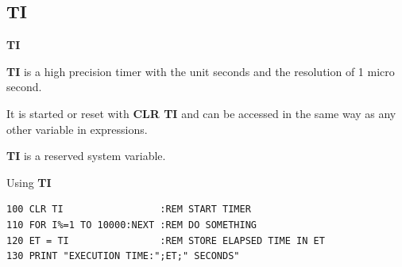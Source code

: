 \newpage
\subsection{TI}
\begin{description}[leftmargin=2cm,style=nextline]
\item [Format:] {\bf TI}
\item [Usage:]  {\bf TI} is a high precision timer with
                the unit seconds and the
                resolution of 1 micro second.

                It is started or reset with
                {\bf CLR TI} and can be accessed in the same way as any
                other variable in expressions.
\item [Remarks:] {\bf TI} is a reserved system variable.

\item [Example:] Using {\bf TI}
\begin{tcolorbox}[colback=black,coltext=white]
\verbatimfont{\codefont}
\begin{verbatim}
100 CLR TI                 :REM START TIMER
110 FOR I%=1 TO 10000:NEXT :REM DO SOMETHING
120 ET = TI                :REM STORE ELAPSED TIME IN ET
130 PRINT "EXECUTION TIME:";ET;" SECONDS"
\end{verbatim}
\end{tcolorbox}
\end{description}


\newpage
